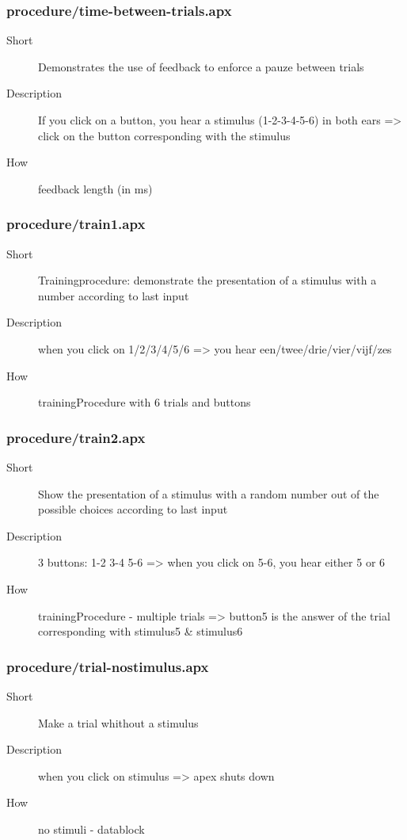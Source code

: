 \subsubsection{procedure/time-between-trials.apx}
\begin{description}
\item[Short] 
 Demonstrates the use of feedback to enforce a pauze between trials
\item[Description] 
 If you click on a button, you hear a stimulus (1-2-3-4-5-6) in both ears =\textgreater{} click on the button corresponding with the stimulus
\item[How] 
 feedback length (in ms)
\end{description}

\subsubsection{procedure/train1.apx}
\begin{description}
\item[Short] 
 Trainingprocedure: demonstrate the presentation of a stimulus with a number according to last input
\item[Description] 
 when you click on 1/2/3/4/5/6 =\textgreater{} you hear een/twee/drie/vier/vijf/zes
\item[How] 
 trainingProcedure with 6 trials and buttons
\end{description}

\subsubsection{procedure/train2.apx}
\begin{description}
\item[Short] 
 Show the presentation of a stimulus with a random number out of the possible choices according to last input
\item[Description] 
 3 buttons: 1-2  3-4  5-6 =\textgreater{} when you click on 5-6, you hear either 5 or 6
\item[How] 
 trainingProcedure - multiple trials =\textgreater{} button5 is the answer of the trial corresponding with stimulus5 \& stimulus6
\end{description}

\subsubsection{procedure/trial-nostimulus.apx}
\begin{description}
\item[Short] 
 Make a trial whithout a stimulus
\item[Description] 
 when you click on stimulus =\textgreater{} apex shuts down
\item[How] 
 no stimuli - datablock
\end{description}

